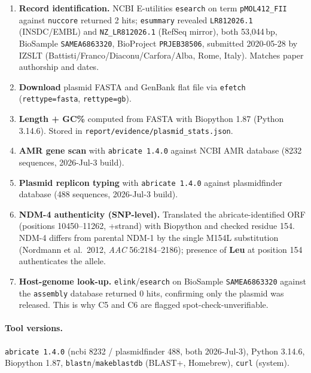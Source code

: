 \documentclass[11pt,a4paper]{article}
\begin{document}
\begin{enumerate}
    \item \textbf{Record identification.} NCBI E-utilities \texttt{esearch}
    on term \texttt{pMOL412\_FII} against \texttt{nuccore} returned 2 hits;
    \texttt{esummary} revealed \texttt{LR812026.1} (INSDC/EMBL) and
    \texttt{NZ\_LR812026.1} (RefSeq mirror), both 53{,}044\,bp, BioSample
    \texttt{SAMEA6863320}, BioProject \texttt{PRJEB38506}, submitted
    2020-05-28 by IZSLT (Battisti/Franco/Diaconu/Carfora/Alba, Rome, Italy).
    Matches paper authorship and dates.

    \item \textbf{Download} plasmid FASTA and GenBank flat file via
    \texttt{efetch} (\texttt{rettype=fasta}, \texttt{rettype=gb}).

    \item \textbf{Length + GC\%} computed from FASTA with Biopython 1.87
    (Python 3.14.6). Stored in \texttt{report/evidence/plasmid\_stats.json}.

    \item \textbf{AMR gene scan} with \texttt{abricate 1.4.0} against
    NCBI AMR database (8232 sequences, 2026-Jul-3 build).

    \item \textbf{Plasmid replicon typing} with \texttt{abricate 1.4.0}
    against plasmidfinder database (488 sequences, 2026-Jul-3 build).

    \item \textbf{NDM-4 authenticity (SNP-level).} Translated the
    abricate-identified ORF (positions 10450--11262, +strand) with Biopython
    and checked residue 154. NDM-4 differs from parental NDM-1 by the single
    M154L substitution (Nordmann et al.\ 2012, \textit{AAC} 56:2184--2186);
    presence of \textbf{Leu} at position 154 authenticates the allele.

    \item \textbf{Host-genome look-up.} \texttt{elink}/\texttt{esearch} on
    BioSample \texttt{SAMEA6863320} against the \texttt{assembly} database
    returned 0 hits, confirming only the plasmid was released. This is why
    C5 and C6 are flagged spot-check-unverifiable.
\end{enumerate}

\paragraph{Tool versions.} \texttt{abricate 1.4.0} (ncbi 8232 /
plasmidfinder 488, both 2026-Jul-3), Python 3.14.6, Biopython 1.87,
\texttt{blastn}/\texttt{makeblastdb} (BLAST+, Homebrew), \texttt{curl}
(system).
\end{document}
